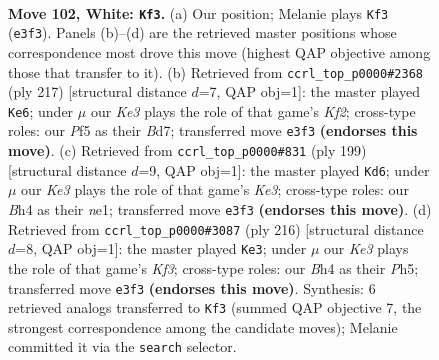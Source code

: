 \documentclass[11pt]{article}
\begin{document}
\clearpage

\begin{figure}[p]\centering
\begin{subfigure}{0.46\textwidth}\centering
\resizebox{\linewidth}{!}{%
\newchessgame
\chessboard[
  setfen={6k1/3n4/8/5P2/p6B/P3K2P/8/8 w - - 23 102},
  showmover=false,
  pgfstyle=straightmove, color=movearrow, markmove={e3-f3}
]}
\caption{}
\end{subfigure}\hfill
\begin{subfigure}{0.46\textwidth}\centering
\resizebox{\linewidth}{!}{%
\newchessgame
\chessboard[
  setfen={8/3b1k2/p7/B6p/7P/K7/8/8 b - - 47 109},
  showmover=false,
  pgfstyle=straightmove, color=movearrow, markmove={f7-e6}
]}
\caption{}
\end{subfigure}
\\[4pt]
\begin{subfigure}{0.46\textwidth}\centering
\resizebox{\linewidth}{!}{%
\newchessgame
\chessboard[
  setfen={8/8/4k3/p7/P2K4/8/4p3/4N3 b - - 67 100},
  showmover=false,
  pgfstyle=straightmove, color=movearrow, markmove={e6-d6}
]}
\caption{}
\end{subfigure}\hfill
\begin{subfigure}{0.46\textwidth}\centering
\resizebox{\linewidth}{!}{%
\newchessgame
\chessboard[
  setfen={8/6k1/3p4/p6P/2P4P/5K2/8/8 w - - 0 109},
  showmover=false,
  pgfstyle=straightmove, color=movearrow, markmove={f3-e3}
]}
\caption{}
\end{subfigure}
\caption{\textbf{Move 102, White: \texttt{Kf3}.} (a) Our position; Melanie plays \texttt{Kf3} (\texttt{e3f3}). Panels (b)--(d) are the retrieved master positions whose correspondence most drove this move (highest QAP objective among those that transfer to it). (b) Retrieved from \texttt{ccrl\_top\_p0000\#2368} (ply 217) [structural distance $d$=7, QAP obj=1]: the master played \texttt{Ke6}; under $\mu$ our \emph{Ke3} plays the role of that game's \emph{Kf2}; cross-type roles: our \emph{P}f5 as their \emph{B}d7; transferred move \texttt{e3f3} \textbf{(endorses this move)}. (c) Retrieved from \texttt{ccrl\_top\_p0000\#831} (ply 199) [structural distance $d$=9, QAP obj=1]: the master played \texttt{Kd6}; under $\mu$ our \emph{Ke3} plays the role of that game's \emph{Ke3}; cross-type roles: our \emph{B}h4 as their \emph{n}e1; transferred move \texttt{e3f3} \textbf{(endorses this move)}. (d) Retrieved from \texttt{ccrl\_top\_p0000\#3087} (ply 216) [structural distance $d$=8, QAP obj=1]: the master played \texttt{Ke3}; under $\mu$ our \emph{Ke3} plays the role of that game's \emph{Kf3}; cross-type roles: our \emph{B}h4 as their \emph{P}h5; transferred move \texttt{e3f3} \textbf{(endorses this move)}. Synthesis: 6 retrieved analogs transferred to \texttt{Kf3} (summed QAP objective 7, the strongest correspondence among the candidate moves); Melanie committed it via the \texttt{search} selector.}
\label{fig:thought-m202}
\end{figure}
\end{document}
